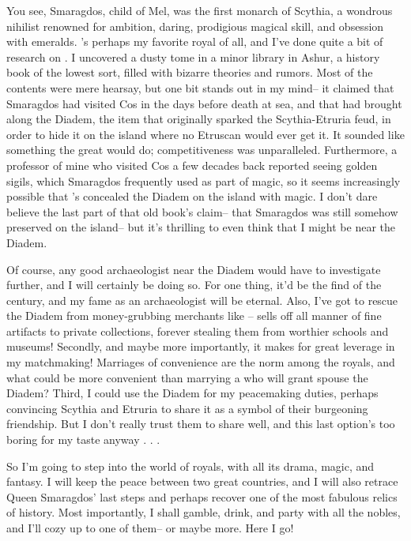 \documentclass[char]{Kos}
\begin{document}
You see, \cEmeraldQueen{\Monarch} Smaragdos, child of Mel, was the first monarch of Scythia, a wondrous nihilist renowned for \cEmeraldQueen{\their} ambition, daring, prodigious magical skill, and obsession with emeralds. \cEmeraldQueen{\They} 's perhaps my favorite royal of all, and I've done quite a bit of research on \cEmeraldQueen{\them}. I uncovered a dusty tome in a minor library in Ashur, a history book of the lowest sort, filled with bizarre theories and rumors. Most of the contents were mere hearsay, but one bit stands out in my mind-- it claimed that Smaragdos had visited Cos in the days before \cEmeraldQueen{\their} death at sea, and that \cEmeraldQueen{\they} had brought along the Diadem, the item that originally sparked the Scythia-Etruria feud, in order to hide it on the island where no Etruscan would ever get it. It sounded like something the great \cEmeraldQueen{\monarch} would do; \cEmeraldQueen{\their} competitiveness was unparalleled. Furthermore, a professor of mine who visited Cos a few decades back reported seeing golden sigils, which Smaragdos frequently used as part of \cEmeraldQueen{\their} magic, so it seems increasingly possible that \cEmeraldQueen{\they}'s concealed the Diadem on the island with \cEmeraldQueen{\their} magic. I don't dare believe the last part of that old book's claim-- that Smaragdos \cEmeraldQueen{\themself} was still somehow preserved on the island-- but it's thrilling to even think that I might be near the Diadem.

Of course, any good archaeologist near the Diadem would have to investigate further, and I will certainly be doing so. For one thing, it'd be the find of the century, and my fame as an archaeologist will be eternal. Also, I've got to rescue the Diadem from money-grubbing merchants like \cMerchant{}-- \cMerchant{\they} sells off all manner of fine artifacts to private collections, forever stealing them from worthier schools and museums!  Secondly, and maybe more importantly, it makes for great leverage in my matchmaking! Marriages of convenience are the norm among the royals, and what could be more convenient than marrying a  \cArchaeologist{\human} who will grant \cArchaeologist{\their} spouse the Diadem? Third, I could use the Diadem for my peacemaking duties, perhaps convincing Scythia and Etruria to share it as a symbol of their burgeoning friendship. But I don't really trust them to share well, and this last option's too boring for my taste anyway . . .

So I'm going to step into the world of royals, with all its drama, magic, and fantasy. I will keep the peace between two great countries, and I will also retrace Queen Smaragdos' last steps and perhaps recover one of the most fabulous relics of history. Most importantly, I shall gamble, drink, and party with all the nobles, and I'll cozy up to one of them-- or maybe more. Here I go!
\end{document}

